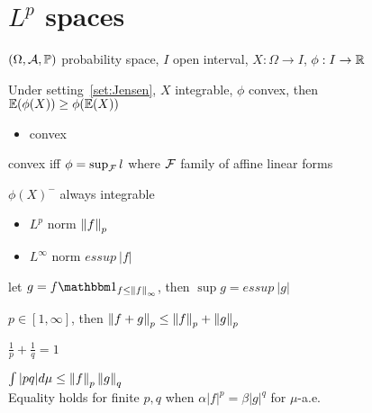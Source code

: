 \section{$L^p$ spaces}\label{sec:space}

\begin{setting}\label{set:Jensen}
    $(\Omega, \mathcal{A}, \mathbb{P})$ probability space, $I$ open interval, $X:\Omega \rightarrow I$, $\phi:I \rightarrow \mathbb{R}$
\end{setting}

\begin{prop}
    Under setting~\ref{set:Jensen}, $X$ integrable, $\phi$ convex, then \\
    $\mathbb{E} (\phi(X)) \geq \phi(\mathbb{E}(X))$
\end{prop}

\begin{itemize}
    \item convex
\end{itemize}

\begin{lemma}
    convex iff $\phi = \sup_{\mathcal{F}} l$ where $\mathcal{F}$ family of affine linear forms
\end{lemma}

\begin{fact}
    $\phi(X)^-$ always integrable
\end{fact}

\begin{itemize}
    \item $L^p$ norm $\left\lVert f\right\rVert_p$
    \item $L^\infty$ norm $essup\ |f|$
\end{itemize}

\begin{fact}
    let $g = f\In_{f \leq \norm{f}_\infty}$, then $\sup g = essup\ |g|$
\end{fact}

\begin{prop}
    $p \in [1, \infty]$, then $\left\lVert f + g\right\rVert_p \leq \left\lVert f\right\rVert_p + \left\lVert g\right\rVert_p$
\end{prop}

\begin{setting}
    $\frac{1}{p} + \frac{1}{q} = 1$
\end{setting}

\begin{prop}
    $\int |pq|d\mu \leq \left\lVert f\right\rVert_p\left\lVert g\right\rVert_q$ \\
    Equality holds for finite $p, q$ when $\alpha |f|^p = \beta |g|^q$ for $\mu$-a.e.\
\end{prop}

